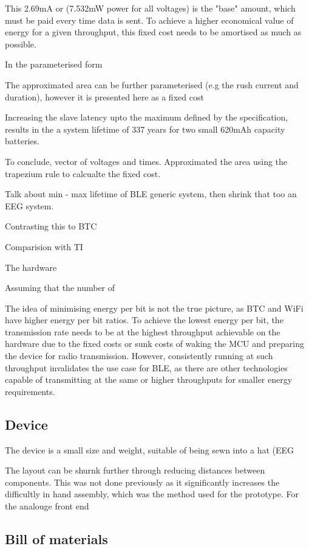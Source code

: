 \documentclass[]{article}
\begin{document}
This 2.69mA or (7.532mW power for all voltages) is the "base" amount, which must be paid every time data is sent. To achieve a higher economical value of energy for a given throughput, this fixed cost needs to be amortised as much as possible. 



In the parameterised form


The approximated area can be further parameterised (e.g the rush current and duration), however it is presented here as a fixed cost

Increasing the slave latency upto the maximum defined by the specification, results in the a system lifetime of 337 years for two small 620mAh capacity batteries. 

To conclude, vector of voltages and times. Approximated the area using the trapezium rule to calcualte the fixed cost. 

Talk about min - max lifetime of BLE generic system, then shrink that too an EEG system.

Contrasting this to \ac{BTC}

Comparision with TI

The hardware

Assuming that the number of 

The idea of minimising energy per bit is not the true picture, as \ac{BTC} and WiFi have higher energy per bit ratios. To achieve the lowest energy per bit, the transmission rate needs to be at the highest throughput achievable on the hardware due to the fixed costs or sunk costs of waking the \ac{MCU} and preparing the device for radio transmission. However, consistently running at such throughput invalidates the use case for \ac{BLE}, as there are other technologies capable of transmitting at the same or higher throughputs for smaller energy requirements.


\subsection{Device}

The device is a small size and weight, suitable of being sewn into a hat (EEG

The layout can be shurnk further through reducing distances between components. This was not done previously as it significantly increases the difficultly in hand assembly, which was the method used for the prototype. For the analouge front end


\subsection{Bill of materials}
\end{document}
